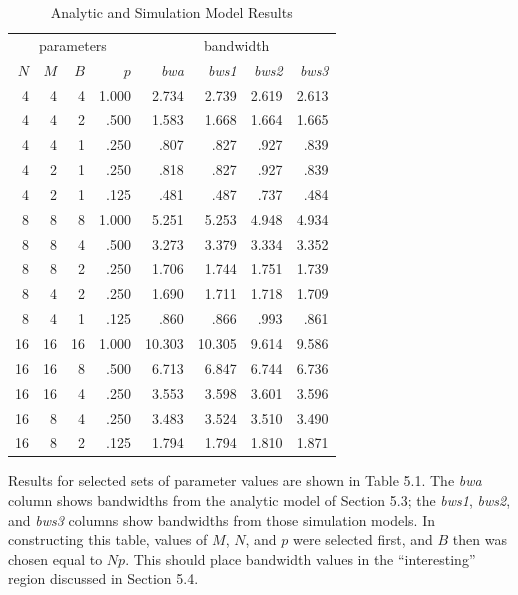 \begin{table}[ht]
\centering
\begin{tabular}{rrrrrrrr}
\multicolumn{4}{c}{parameters} & \multicolumn{4}{c}{bandwidth} \\
$N$ & $M$ & $B$ & $p$ & \emph{bwa} & \emph{bws1} & \emph{bws2} & \emph{bws3} \\
4 & 4 & 4 & 1.000 & 2.734 & 2.739 & 2.619 & 2.613 \\
4 & 4 & 2 & .500 & 1.583 & 1.668 & 1.664 & 1.665 \\
4 & 4 & 1 & .250 & .807 & .827 & .927 & .839 \\
4 & 2 & 1 & .250 & .818 & .827 & .927 & .839 \\
4 & 2 & 1 & .125 & .481 & .487 & .737 & .484 \\
\noalign{\smallskip}
8 & 8 & 8 & 1.000 & 5.251 & 5.253 & 4.948 & 4.934 \\
8 & 8 & 4 & .500 & 3.273 & 3.379 & 3.334 & 3.352 \\
8 & 8 & 2 & .250 & 1.706 & 1.744 & 1.751 & 1.739 \\
8 & 4 & 2 & .250 & 1.690 & 1.711 & 1.718 & 1.709 \\
8 & 4 & 1 & .125 & .860 & .866 & .993 & .861 \\
\noalign{\smallskip}
16 & 16 & 16 & 1.000 & 10.303 & 10.305 & 9.614 & 9.586 \\
16 & 16 & 8 & .500 & 6.713 & 6.847 & 6.744 & 6.736 \\
16 & 16 & 4 & .250 & 3.553 & 3.598 & 3.601 & 3.596 \\
16 & 8 & 4 & .250 & 3.483 & 3.524 & 3.510 & 3.490 \\
16 & 8 & 2 & .125 & 1.794 & 1.794 & 1.810 & 1.871
\end{tabular}
\caption{Analytic and Simulation Model Results}
\end{table}

Results for selected sets of parameter values are shown in Table 5.1. The
\emph{bwa} column shows bandwidths from the analytic model of Section 5.3; the
\emph{bws1}, \emph{bws2}, and \emph{bws3} columns show bandwidths from those simulation
models. In constructing this table, values of $M$, $N$, and $p$ were selected first,
and $B$ then was chosen equal to $Np$. This should place bandwidth values in
the ``interesting'' region discussed in Section 5.4.

